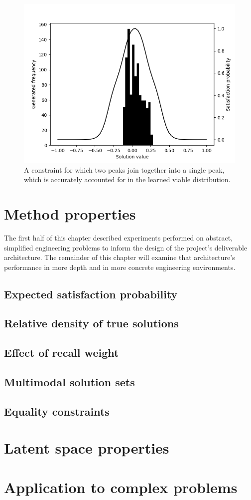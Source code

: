 \documentclass[../../main.tex]{subfiles}
\begin{document}
\begin{figure}[H]
    \begin{center}
    \includegraphics[width=\textwidth]{embeddedConstraint7}
    \caption{
        A constraint for which two peaks join together into a single peak, which is accurately accounted for in the learned viable distribution.
    }
    \label{fig:embeddedConstraintJoinedModes}
    \end{center}
\end{figure}

\section{Method properties}

The first half of this chapter described experiments performed on abstract, simplified engineering problems to inform the design of the project's deliverable architecture.
The remainder of this chapter will examine that architecture's performance in more depth and in more concrete engineering environments.

\subsection{Expected satisfaction probability}
\subsection{Relative density of true solutions}
\subsection{Effect of recall weight}
\subsection{Multimodal solution sets}
\subsection{Equality constraints}

\section{Latent space properties}

\section{Application to complex problems}
\end{document}
